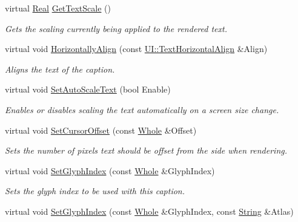 \begin{DoxyCompactItemize}
virtual \hyperlink{namespaceMezzanine_a726731b1a7df72bf3583e4a97282c6f6}{Real} \hyperlink{classMezzanine_1_1UI_1_1Caption_ad0bb9026c09e4b808c1a12f2546a76c5}{GetTextScale} ()
\begin{DoxyCompactList}\small\item\em Gets the scaling currently being applied to the rendered text. \item\end{DoxyCompactList}\item 
virtual void \hyperlink{classMezzanine_1_1UI_1_1Caption_a5d2537a5d2e7b327a3ea36fdb75fd77c}{HorizontallyAlign} (const \hyperlink{namespaceMezzanine_1_1UI_aebbd46e62bb20d958f1915c1ec6cc549}{UI::TextHorizontalAlign} \&Align)
\begin{DoxyCompactList}\small\item\em Aligns the text of the caption. \item\end{DoxyCompactList}\item 
virtual void \hyperlink{classMezzanine_1_1UI_1_1Caption_a9f8c1df0391939b5a4b740515ebe0df8}{SetAutoScaleText} (bool Enable)
\begin{DoxyCompactList}\small\item\em Enables or disables scaling the text automatically on a screen size change. \item\end{DoxyCompactList}\item 
virtual void \hyperlink{classMezzanine_1_1UI_1_1Caption_a93607a41a5d18e2a529c5893b6aae921}{SetCursorOffset} (const \hyperlink{namespaceMezzanine_adcbb6ce6d1eb4379d109e51171e2e493}{Whole} \&Offset)
\begin{DoxyCompactList}\small\item\em Sets the number of pixels text should be offset from the side when rendering. \item\end{DoxyCompactList}\item 
virtual void \hyperlink{classMezzanine_1_1UI_1_1Caption_a2cc9da9ae1e10cd5829117f0d473186a}{SetGlyphIndex} (const \hyperlink{namespaceMezzanine_adcbb6ce6d1eb4379d109e51171e2e493}{Whole} \&GlyphIndex)
\begin{DoxyCompactList}\small\item\em Sets the glyph index to be used with this caption. \item\end{DoxyCompactList}\item 
virtual void \hyperlink{classMezzanine_1_1UI_1_1Caption_abe41befd65e977a1bb300427d0dd5936}{SetGlyphIndex} (const \hyperlink{namespaceMezzanine_adcbb6ce6d1eb4379d109e51171e2e493}{Whole} \&GlyphIndex, const \hyperlink{namespaceMezzanine_acf9fcc130e6ebf08e3d8491aebcf1c86}{String} \&Atlas)

\end{DoxyCompactItemize}
